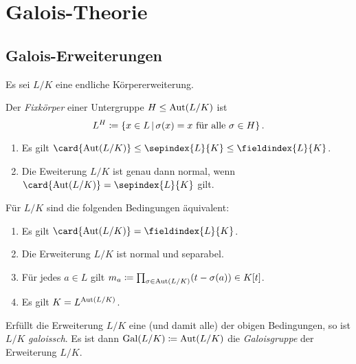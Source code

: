 \chapter{Galois-Theorie}





\section{Galois-Erweiterungen}

Es sei $L/K$ eine endliche Körpererweiterung.

\begin{definition}
  Der \emph{Fixkörper} einer Untergruppe $H \mathrel{\leq} \operatorname{Aut}(L/K)$ ist
  \[
              L^H
    \defined  \{
                x \in L
              \suchthat
                \text{$\sigma(x) = x$ für alle $\sigma \in H$}
              \} \,.
  \]

\end{definition}

\begin{lemma}
  \begin{enumerate}
    \item
      Es gilt $\card{\Aut{L/K}} \leq \sepindex{L}{K} \leq \fieldindex{L}{K}$.
    \item
      Die Eweiterung $L/K$ ist genau dann normal, wenn $\card{\Aut{L/K}} = \sepindex{L}{K}$ gilt.
  \end{enumerate}
\end{lemma}


\begin{proposition}
  Für $L/K$ sind die folgenden Bedingungen äquivalent:
  \begin{enumerate}
    \item
      Es gilt $\card{\Aut{L/K}} = \fieldindex{L}{K}$.
    \item
      Die Erweiterung $L/K$ ist normal und separabel.
    \item
      Für jedes $a \in L$ gilt $m_a \coloneqq \prod_{\sigma \in \operatorname{Aut}(L/K)} (t - \sigma(a)) \in K[t]$.
    \item
      Es gilt $K = L^{\operatorname{Aut}(L/K)}$.
  \end{enumerate}
\end{proposition}

\begin{definition}
  Erfüllt die Erweiterung $L/K$ eine \textup(und damit alle\textup) der obigen Bedingungen, so ist $L/K$ \emph{galoissch}.
  Es ist dann $\operatorname{Gal}(L/K) \coloneqq \operatorname{Aut}(L/K)$ die \emph{Galoisgruppe} der Erweiterung $L/K$.
\end{definition}

